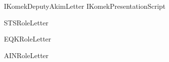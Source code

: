 \renewcommand\ExhibitGroup{Role}

{IKomekDeputyAkimLetter}
{IKomekPresentationScript}

{STSRoleLetter}

{EQKRoleLetter}

{AINRoleLetter}
